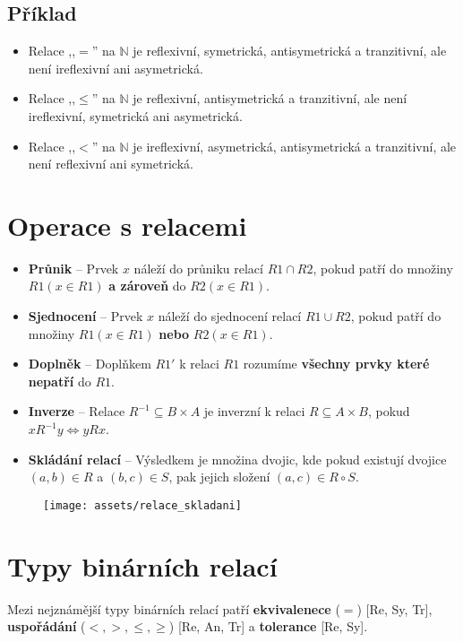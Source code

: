 \subsection*{Příklad}
\begin{itemize}
    \item Relace ,,$=$'' na $ \mathbb{N} $ je reflexivní, symetrická, antisymetrická a tranzitivní, ale není ireflexivní ani asymetrická.
    \item Relace ,,$\leq$'' na $ \mathbb{N} $ je reflexivní, antisymetrická a tranzitivní, ale není ireflexivní, symetrická ani asymetrická.
    \item Relace ,,$<$'' na $ \mathbb{N} $ je ireflexivní, asymetrická, antisymetrická a tranzitivní, ale není reflexivní ani symetrická.
\end{itemize}

\section{Operace s relacemi}
\begin{itemize}
    \item \textbf{Průnik} -- Prvek $ x $ náleží do průniku relací $ R1 \cap R2 $, pokud patří do množiny $ R1 (x \in R1) $ \textbf{a zároveň} do $ R2 (x \in R1)$.
    \item \textbf{Sjednocení} -- Prvek $ x $ náleží do sjednocení relací $ R1 \cup R2 $, pokud patří do množiny $ R1 (x \in R1) $ \textbf{nebo} $ R2 (x \in R1)$.
    \item \textbf{Doplněk} -- Doplňkem $ R1' $ k relaci $ R1 $ rozumíme \textbf{všechny prvky které nepatří} do $ R1 $.
    \item \textbf{Inverze} -- Relace $ R^{-1} \subseteq B \times A $ je inverzní k relaci $ R \subseteq A \times B $, pokud $ xR^{-1}y \Leftrightarrow yRx $.
    \item \textbf{Skládání relací} -- Výsledkem je množina dvojic, kde pokud existují dvojice $(a, b)\in R$ a $(b, c)\in S$, pak jejich složení $(a, c) \in R \circ S$.
\end{itemize}

\begin{figure}[H]
    \centering
    \texttt{[image: assets/relace\_skladani]}
\end{figure}

\section{Typy binárních relací}
Mezi nejznámější typy binárních relací patří \textbf{ekvivalenece} ($=$) [Re, Sy, Tr], \textbf{uspořádání} ($ <, >, \leq, \geq $) [Re, An, Tr] a \textbf{tolerance} [Re, Sy].

